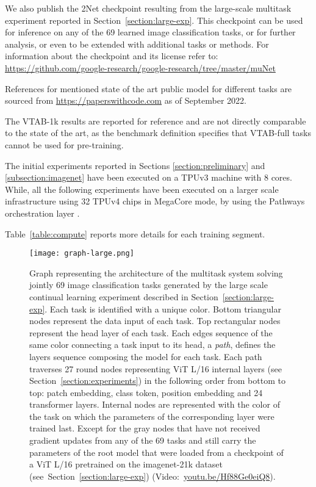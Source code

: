 \documentclass{article} \usepackage{iclr2023_conference,times}
\newcommand{\muNet}{2Net\xspace}
\begin{document}
We also publish the \muNet checkpoint resulting from the large-scale multitask experiment reported in Section~\ref{section:large-exp}.
This checkpoint can be used for inference on any of the 69 learned image classification tasks,
or for further analysis, or even to be extended with additional tasks or methods. For information about the checkpoint and its license refer to:
\href{https://github.com/google-research/google-research/tree/master/muNet}{https://github.com/google-research/google-research/tree/master/muNet}


References for mentioned state of the art public model for different tasks are sourced from \href{https://paperswithcode.com}{https://paperswithcode.com} as of September 2022.


The VTAB-1k results are reported for reference and are not directly comparable to the state of the art, as the benchmark definition specifies that VTAB-full tasks cannot be used for pre-training.

The initial experiments reported in Sections \ref{section:preliminary} and \ref{subsection:imagenet} have been executed on a TPUv3 \citep{Jouppi2017IndatacenterPA} machine with 8 cores.
While, all the following experiments have been executed on a larger scale infrastructure using 32 TPUv4 chips in MegaCore mode,
by using the Pathways orchestration layer \citep{Barham2022PathwaysAD}.

Table~\ref{table:compute} reports more details for each training segment.



\begin{figure}[t]
\centering
\texttt{[image: graph-large.png]}
\caption{Graph representing the architecture of the multitask system solving jointly 69 image classification tasks generated by the large scale continual learning experiment described in Section~\ref{section:large-exp}.
Each task is identified with a unique color.
Bottom triangular nodes represent the data input of each task.
Top rectangular nodes represent the head layer of each task.
Each edges sequence of the same color connecting a task input to its head, a \emph{path}, defines the layers sequence composing the model for each task.
Each path traverses 27 round nodes representing ViT L/16 internal layers (see Section~\ref{section:experiments}) in the following order from bottom to top: patch embedding, class token, position embedding and 24 transformer layers.
Internal nodes are represented with the color of the task on which the parameters of the corresponding layer were trained last.
Except for the gray nodes that have not received gradient updates from any of the 69 tasks and still carry the parameters of the root model that were loaded from a checkpoint of a ViT L/16 pretrained on the imagenet-21k dataset (see~Section~\ref{section:large-exp})
(Video:~\href{https://youtu.be/Hf88Ge0eiQ8}{youtu.be/Hf88Ge0eiQ8}).
}
\label{fig:deca-30}
\end{figure}
\end{document}
